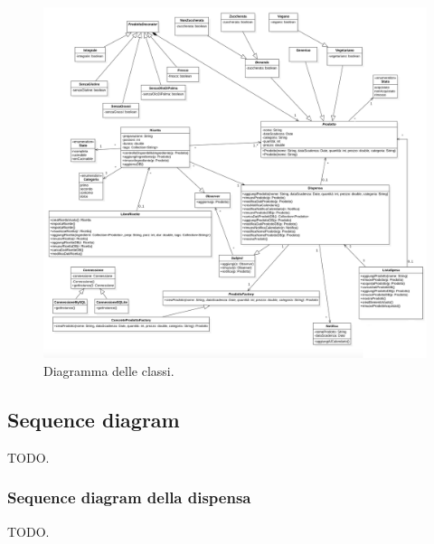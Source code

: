 \documentclass{article}
\begin{document}
\begin{figure}[H]
    \includegraphics[width=\linewidth]{images/class.jpeg}
    \caption{Diagramma delle classi.}
    \label{fig:classdiagram}
\end{figure}

\subsection{Sequence diagram}

TODO.

\subsubsection{Sequence diagram della dispensa}

TODO.
\end{document}
